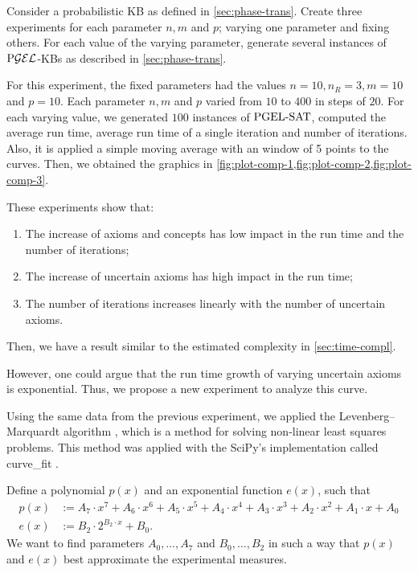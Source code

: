 Consider a probabilistic KB as defined in \cref{sec:phase-trans}. Create three experiments for each parameter $n, m$ and $p$; varying one parameter and fixing others. For each value of the varying parameter, generate several instances of $\text{P}\mathcal{GEL}$-KBs as described in \cref{sec:phase-trans}.

For this experiment, the fixed parameters had the values $n = 10, n_R = 3, m = 10$ and $p = 10$. Each parameter $n, m$ and $p$ varied from $10$ to $400$ in steps of $20$. For each varying value, we generated $100$ instances of $\text{PGEL-SAT}$, computed the average run time, average run time of a single iteration and number of iterations. Also, it is applied a simple moving average with an window of 5 points to the curves.  Then, we obtained the graphics in \cref{fig:plot-comp-1,fig:plot-comp-2,fig:plot-comp-3}. 

These experiments show that:
\begin{enumerate}[label=(\alph*)]
  \item The increase of axioms and concepts has low impact in the run time and the number of iterations;
  \item The increase of uncertain axioms has high impact in the run time;
  \item The number of iterations increases linearly with the number of uncertain axioms.
\end{enumerate}
Then, we have a result similar to the estimated complexity in \cref{sec:time-compl}.

However, one could argue that the run time growth of varying uncertain axioms is exponential. Thus, we propose a new experiment to analyze this curve.

Using the same data from the previous experiment, we applied the Levenberg–Marquardt algorithm \citep{levenberg1944method,marquardt1963algorithm}, which is a method for solving non-linear least squares problems. This method was applied with the SciPy's implementation called \textsf{curve\_fit} \citep{2020SciPy-NMeth}. 

Define a polynomial $p(x)$ and an exponential function $e(x)$, such that
\begin{align*}
  p(x) &:= A_7 \cdot x^7 + A_6 \cdot x^6 + A_5 \cdot x^5 +A_4 \cdot x^4 + A_3 \cdot x^3 + A_2 \cdot x^2 + A_1 \cdot x + A_0\\
  e(x) &:= B_2 \cdot 2^{B_2 \cdot x} + B_0.
\end{align*}
We want to find parameters $A_0, \dots, A_7$ and $B_0, \dots, B_2$ in such a way that $p(x)$ and $e(x)$ best approximate the experimental measures. 

